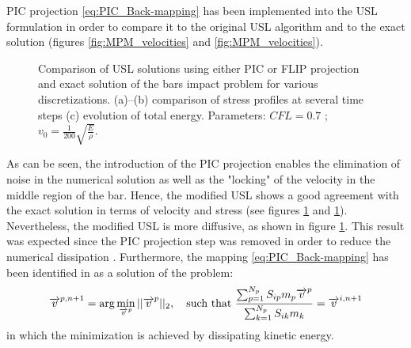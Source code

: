 PIC projection \eqref{eq:PIC_Back-mapping} has been implemented into the USL formulation in order to compare it to the original USL algorithm and to the exact solution (figures \ref{fig:MPM_velocities} and \ref{fig:MPM_velocities}). 
\begin{figure}[ht]
  \centering
  {  \label{subfig:mpm_diffusion_10}}
  {  \label{subfig:mpm_diffusion_25}}
  {  \label{subfig:mpm_energies}}
  \caption{Comparison of USL solutions using either PIC or FLIP projection and exact solution of the bars impact problem for various discretizations. (a)--(b) comparison of stress profiles at several time steps (c) evolution of total energy. Parameters: $CFL=0.7$ ; $v_0=\frac{1}{200}\sqrt{\frac{E}{\rho}}$.}
  \label{fig:mpm_diffusion}
\end{figure}
As can be seen, the introduction of the PIC projection enables the elimination of noise in the numerical solution as well as the "locking" of the velocity in the middle region of the bar. Hence, the modified USL shows a good agreement with the exact solution in terms of velocity and stress (see figures \ref{fig:mpm_diffusion} and \ref{fig:mpm_diffusion}). Nevertheless, the modified USL is more diffusive, as shown in figure \ref{fig:mpm_diffusion}. This result was expected since the PIC projection step was removed in order to reduce the numerical dissipation \cite{PIC_Nishiguchi}. Furthermore, the mapping \eqref{eq:PIC_Back-mapping} has been identified in \cite{XPIC} as a solution of the problem:
\begin{equation}
  {\overrightarrow{v}}^{p,n+1} = \arg \min_{{\overrightarrow{v}}^{p}}|| {\overrightarrow{v}}^{p}||_2,\quad \text{such that }  \frac{\sum_{p=1}^{N_p}S_{ip} m_p{\overrightarrow{v}}^{p}}{\sum_{k=1}^{N_p}S_{ik} m_k}={\overrightarrow{v}}^{i,n+1}
\end{equation}
in which the minimization is achieved by dissipating kinetic energy.
 



